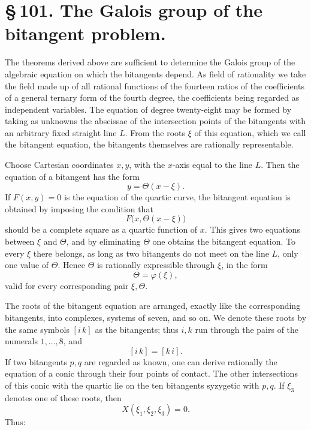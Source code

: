 \documentclass[11pt]{article}
\providecommand{\pair}[2]{[#1\,#2]}
\begin{document}
\section*{\S\,101. The Galois group of the bitangent problem.}

The theorems derived above are sufficient to determine the Galois group of the algebraic equation on which the bitangents depend. As field of rationality we take the field made up of all rational functions of the fourteen ratios of the coefficients of a general ternary form of the fourth degree, the coefficients being regarded as independent variables. The equation of degree twenty-eight may be formed by taking as unknowns the abscissae of the intersection points of the bitangents with an arbitrary fixed straight line \(L\). From the roots \(\xi\) of this equation, which we call the bitangent equation, the bitangents themselves are rationally representable.

Choose Cartesian coordinates \(x,y\), with the \(x\)-axis equal to the line \(L\). Then the equation of a bitangent has the form
\begin{equation}
 y=\Theta(x-\xi). \tag{1}
\end{equation}
If \(F(x,y)=0\) is the equation of the quartic curve, the bitangent equation is obtained by imposing the condition that
\[
 F\bigl(x,\Theta(x-\xi)\bigr)
\]
should be a complete square as a quartic function of \(x\). This gives two equations between \(\xi\) and \(\Theta\), and by eliminating \(\Theta\) one obtains the bitangent equation. To every \(\xi\) there belongs, as long as two bitangents do not meet on the line \(L\), only one value of \(\Theta\). Hence \(\Theta\) is rationally expressible through \(\xi\), in the form
\begin{equation}
 \Theta=\varphi(\xi), \tag{2}
\end{equation}
valid for every corresponding pair \(\xi,\Theta\).

The roots of the bitangent equation are arranged, exactly like the corresponding bitangents, into complexes, systems of seven, and so on. We denote these roots by the same symbols \(\pair{i}{k}\) as the bitangents; thus \(i,k\) run through the pairs of the numerals \(1,
\ldots,8\), and
\[
 \pair{i}{k}=\pair{k}{i}.
\]
If two bitangents \(p,q\) are regarded as known, one can derive rationally the equation of a conic through their four points of contact. The other intersections of this conic with the quartic lie on the ten bitangents syzygetic with \(p,q\). If \(\xi_3\) denotes one of these roots, then
\begin{equation}
 X(\xi_1,\xi_2,\xi_3)=0. \tag{3}
\end{equation}
Thus:
\end{document}
